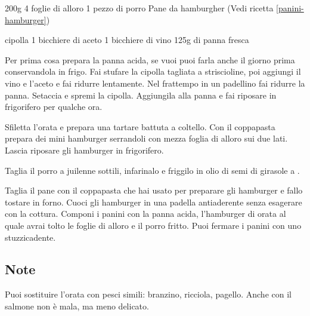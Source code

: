 \begin{ingreds}
	200g 
	4 foglie di alloro
	1 pezzo di porro
	Pane da hamburgher (Vedi ricetta \ref{panini-hamburger})
	
\columnbreak
{} cipolla
	1 bicchiere di aceto
	1 bicchiere di vino
	125g di panna fresca
\end{ingreds}

\begin{method}
Per prima cosa prepara la panna acida, se vuoi puoi farla anche il giorno prima conservandola in frigo. Fai stufare la cipolla tagliata a striscioline, poi aggiungi il vino e l'aceto e fai ridurre lentamente. Nel frattempo in un padellino fai ridurre la panna. Setaccia e spremi la cipolla. Aggiungila alla panna e fai riposare in frigorifero per qualche ora.

Sfiletta l'orata e prepara una tartare battuta a coltello. Con il coppapasta prepara dei mini hamburger serrandoli con mezza foglia di alloro sui due lati. Lascia riposare gli hamburger in frigorifero.

Taglia il porro a juilenne sottili, infarinalo e friggilo in olio di semi di girasole a .

Taglia il pane con il coppapasta che hai usato per preparare gli hamburger e fallo tostare in forno. Cuoci gli hamburger in una padella antiaderente senza esagerare con la cottura. Componi i panini con la panna acida, l'hamburger di orata al quale avrai tolto le foglie di alloro e il porro fritto. Puoi fermare i panini con uno stuzzicadente.
\end{method}
\subsection*{Note}
		Puoi sostituire l'orata con pesci simili: branzino, ricciola, pagello. Anche con il salmone non è mala, ma meno delicato.

